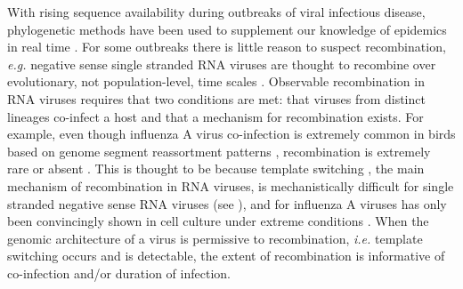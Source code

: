 \documentclass[11pt,oneside,letterpaper]{article}
\begin{document}
With rising sequence availability during outbreaks of viral infectious disease, phylogenetic methods have been used to supplement our knowledge of epidemics in real time \citep{smith_2009,rambaut_2009,lemey_2009,drosten_2013,cotten_2013,cotten_2014,drosten_2014,gire_2014}.
For some outbreaks there is little reason to suspect recombination, \textit{e.g.} negative sense single stranded RNA viruses are thought to recombine over evolutionary, not population-level, time scales \citep{chare_2003}.
Observable recombination in RNA viruses requires that two conditions are met: that viruses from distinct lineages co-infect a host and that a mechanism for recombination exists.
For example, even though influenza A virus co-infection is extremely common in birds based on genome segment reassortment patterns \citep{li_2004,dong_2011,lu_2014}, recombination is extremely rare or absent \citep{chare_2003,boni_2010}.
This is thought to be because template switching \citep{kirkegaard_1986,baric_1987}, the main mechanism of recombination in RNA viruses, is mechanistically difficult for single stranded negative sense RNA viruses (see \citealt{chare_2003}), and for influenza A viruses has only been convincingly shown in cell culture under extreme conditions \citep{mitnaul_2000}.
When the genomic architecture of a virus is permissive to recombination, \textit{i.e.} template switching occurs and is detectable, the extent of recombination is informative of co-infection and/or duration of infection.
\end{document}
